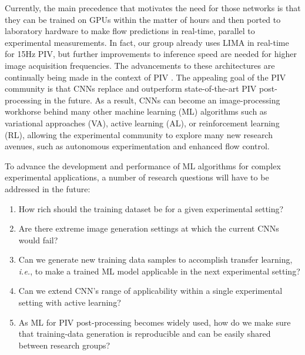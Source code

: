 \documentclass[a4paper,fleqn]{cas-dc}
\begin{document}
Currently, the main precedence that motivates the need for those networks is that they can be trained on GPUs within the matter of hours and then ported to laboratory hardware to make flow predictions in real-time, parallel to experimental measurements. In fact, our group already uses LIMA in real-time for 15Hz PIV, but further improvements to inference speed are needed for higher image acquisition frequencies. The advancements to these architectures are continually being made in the context of PIV \citep{shan2024lightweight, elrefaie2024site}. The appealing goal of the PIV community is that CNNs replace and outperform state-of-the-art PIV post-processing in the future. As a result, CNNs can become an image-processing workhorse behind many other machine learning (ML) algorithms such as variational approaches (VA), active learning (AL), or reinforcement learning (RL), allowing the experimental community to explore many new research avenues, such as autonomous experimentation and enhanced flow control.

To advance the development and performance of ML algorithms for complex experimental applications, a number of research questions will have to be addressed in the future:
\begin{enumerate}
\item How rich should the training dataset be for a given experimental setting?
\item Are there extreme image generation settings at which the current CNNs would fail?
\item Can we generate new training data samples to accomplish transfer learning, \textit{i.e.}, to make a trained ML model applicable in the next experimental setting?
\item Can we extend CNN's range of applicability within a single experimental setting with active learning?
\item As ML for PIV post-processing becomes widely used, how do we make sure that training-data generation is reproducible and can be easily shared between research groups?
\end{enumerate}
\end{document}
